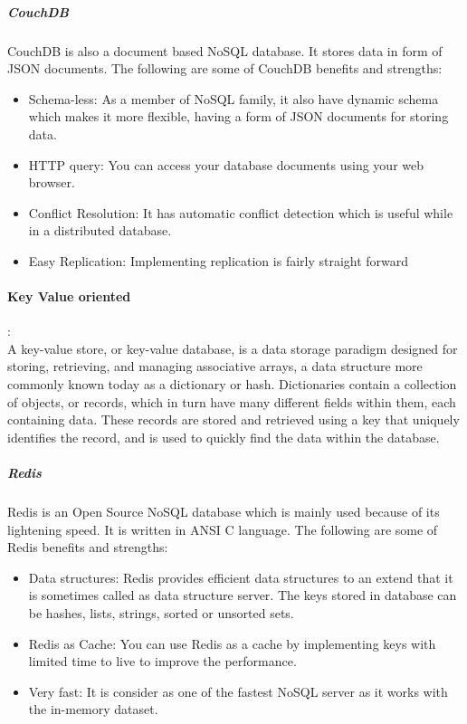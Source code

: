 \subparagraph{CouchDB} 
\label{sec:sec01}
CouchDB is also a document based NoSQL database.
It stores data in form of JSON documents. The following are some of CouchDB benefits and strengths:
 \begin{itemize}
  \item Schema-less: As a member of NoSQL family, it also have dynamic schema which makes it more flexible, having a form of JSON documents for storing data.
  \item HTTP query: You can access your database documents using your web browser.
  \item Conflict Resolution: It has automatic conflict detection which is useful while in a distributed database.
  \item Easy Replication: Implementing replication is fairly straight forward
\end{itemize}



\paragraph{Key Value oriented } :\\
\label{sec:sec01}
A key-value store, or key-value database, is a data storage paradigm designed for storing, 
retrieving, and managing associative arrays, a data structure more commonly 
known today as a dictionary or hash. Dictionaries contain a collection of objects, 
or records, which in turn have many different fields within them, each containing data. 
These records are stored and retrieved using a key that uniquely identifies the record, 
and is used to quickly find the data within the database.
\subparagraph{Redis} 
\label{sec:sec01}
Redis is an Open Source NoSQL database which is mainly used because of its lightening speed. It is written in ANSI C language. The following are some of Redis benefits and strengths:
 \begin{itemize}
  \item Data structures: Redis provides efficient data structures to an extend that it is sometimes called as data structure server. The keys stored in database can be hashes, lists, strings, sorted or unsorted sets.
  \item Redis as Cache: You can use Redis as a cache by implementing keys with limited time to live to improve the performance.
  \item Very fast: It is consider as one of the fastest NoSQL server as it works with the in-memory dataset.
\end{itemize}



